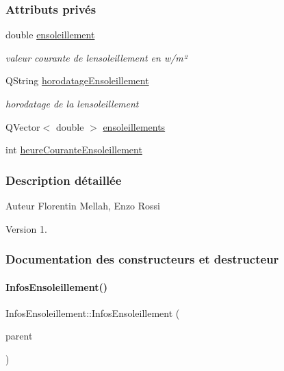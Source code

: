 \subsubsection*{Attributs privés}
\begin{DoxyCompactItemize}
\item 
double \hyperlink{class_infos_ensoleillement_a5f3ad64743e3beeb4e64c4555ec6155c}{ensoleillement}
\begin{DoxyCompactList}\small\item\em valeur courante de l\textquotesingle{}ensoleillement en w/m² \end{DoxyCompactList}\item 
Q\+String \hyperlink{class_infos_ensoleillement_aa2014f9d13e69e9807543737240dbfd3}{horodatage\+Ensoleillement}
\begin{DoxyCompactList}\small\item\em horodatage de la l\textquotesingle{}ensoleillement \end{DoxyCompactList}\item 
Q\+Vector$<$ double $>$ \hyperlink{class_infos_ensoleillement_a6c3640ed7f3169e6263dc04b0191f478}{ensoleillements}
\item 
int \hyperlink{class_infos_ensoleillement_adbf40d147f8a7dbcf5f71b1ac4e0933d}{heure\+Courante\+Ensoleillement}
\end{DoxyCompactItemize}


\subsubsection{Description détaillée}
\begin{DoxyAuthor}{Auteur}
Florentin Mellah, Enzo Rossi
\end{DoxyAuthor}
\begin{DoxyVersion}{Version}
1. 
\end{DoxyVersion}


\subsubsection{Documentation des constructeurs et destructeur}
\mbox{\label{class_infos_ensoleillement_a5037621d40a4e62f01182f6742388fcd}} 
\paragraph{\texorpdfstring{Infos\+Ensoleillement()}{InfosEnsoleillement()}}
{\footnotesize\ttfamily Infos\+Ensoleillement\+::\+Infos\+Ensoleillement (\begin{DoxyParamCaption}\item[{\hyperlink{class_q_object}{Q\+Object} $\ast$}]{parent }\end{DoxyParamCaption})}

